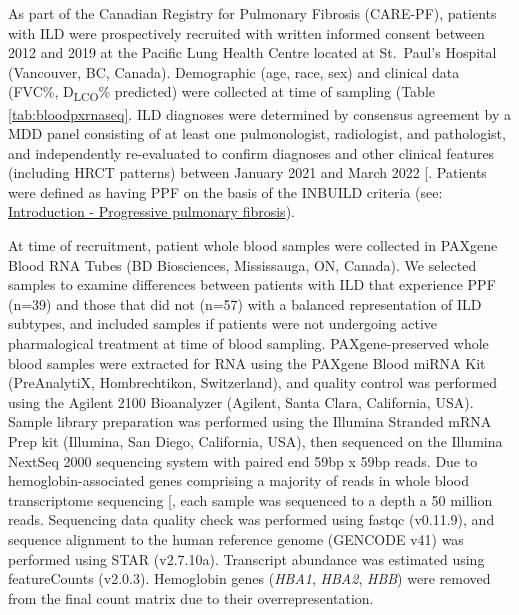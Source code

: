 \documentclass[
]{article}
\begin{document}
As part of the Canadian Registry for Pulmonary Fibrosis (CARE-PF), patients with ILD were prospectively recruited with written informed consent between 2012 and 2019 at the Pacific Lung Health Centre located at St.~Paul's Hospital (Vancouver, BC, Canada). Demographic (age, race, sex) and clinical data (FVC\%, D\textsubscript{LCO}\% predicted) were collected at time of sampling (Table \ref{tab:bloodpxrnaseq}. ILD diagnoses were determined by consensus agreement by a MDD panel consisting of at least one pulmonologist, radiologist, and pathologist, and independently re-evaluated to confirm diagnoses and other clinical features (including HRCT patterns) between January 2021 and March 2022 {[}\citeproc{ref-marinescu_integration_2023}{121}{]}. Patients were defined as having PPF on the basis of the INBUILD criteria (see: \hyperref[ppf]{Introduction - Progressive pulmonary fibrosis}).

At time of recruitment, patient whole blood samples were collected in PAXgene Blood RNA Tubes (BD Biosciences, Mississauga, ON, Canada). We selected samples to examine differences between patients with ILD that experience PPF (n=39) and those that did not (n=57) with a balanced representation of ILD subtypes, and included samples if patients were not undergoing active pharmalogical treatment at time of blood sampling. PAXgene-preserved whole blood samples were extracted for RNA using the PAXgene Blood miRNA Kit (PreAnalytiX, Hombrechtikon, Switzerland), and quality control was performed using the Agilent 2100 Bioanalyzer (Agilent, Santa Clara, California, USA). Sample library preparation was performed using the Illumina Stranded mRNA Prep kit (Illumina, San Diego, California, USA), then sequenced on the Illumina NextSeq 2000 sequencing system with paired end 59bp x 59bp reads. Due to hemoglobin-associated genes comprising a majority of reads in whole blood transcriptome sequencing {[}\citeproc{ref-shin_variation_2014}{122}{]}, each sample was sequenced to a depth a 50 million reads. Sequencing data quality check was performed using fastqc (v0.11.9), and sequence alignment to the human reference genome (GENCODE v41) was performed using STAR (v2.7.10a). Transcript abundance was estimated using featureCounts (v2.0.3). Hemoglobin genes (\textit{HBA1}, \textit{HBA2}, \textit{HBB}) were removed from the final count matrix due to their overrepresentation.
\end{document}
